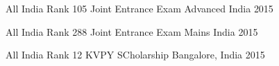 \begin{cvhonors}

  \cvhonor
  {All India Rank 105}
  {Joint Entrance Exam Advanced}
  {India}
  {2015}

  \cvhonor
  {All India Rank 288}
  {Joint Entrance Exam Mains}
  {India}
  {2015}

  \cvhonor
  {All India Rank 12}
  {KVPY SCholarship}
  {Bangalore, India}
  {2015}

\end{cvhonors}

